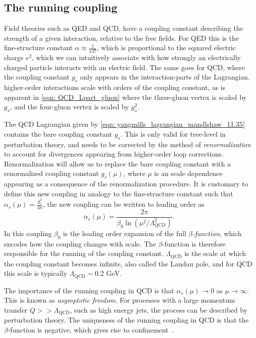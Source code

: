 \documentclass[main.tex]{subfiles}
\begin{document}
\subsection{The running coupling}
Field theories such as QED and QCD, have a coupling constant describing the strength of a given interaction, relative to the free fields. For QED this is the fine-structure constant \(\alpha \approx \frac{1}{137}\), which is proportional to the squared electric charge \(e^2\), which we can intuitively associate with how strongly an electrically charged particle interacts with an electric field. The same goes for QCD, where the coupling constant \(g_s\) only appears in the interaction-parts of the Lagrangian. higher-order interactions scale with orders of the coupling constant, as is apparent in \autoref{eqn: QCD_Lpart_gluon} where the three-gluon vertex is scaled by \(g_s\), and the four-gluon vertex is scaled by \(g_s^2\). 

The QCD Lagrangian given by \autoref{eqn: yangmills_lagrangian_mandlshaw_11.35} contains the bare coupling constant \(g_s\). This is only valid for tree-level in perturbation theory, and needs to be corrected by the method of \emph{renormalization} to account for divergences appearing from higher-order loop corrections. Renormalization will allow us to replace the bare coupling constant with a renormalized coupling constant \(g_r(\mu)\), where \(\mu\) is an scale dependence appearing as a consequence of the renormalization procedure. It is customary to define this new coupling in analogy to the fine-structure constant such that \(\alpha_s(\mu)=\frac{g_r^2}{4\pi}\), the new coupling can be written to leading order as
\begin{equation}\label{eqn: coupling_QCD_running}
    \alpha_s(\mu) = \frac{2\pi}{\beta_0 \ln(\mu^2/\Lambda_{\text{QCD}}^2)}.
\end{equation}
In this coupling \(\beta_0\) is the leading order expansion of the full \emph{\(\beta\)-function}, which encodes how the coupling changes with scale. The \(\beta\)-function is therefore responsible for the running of the coupling constant. \(\Lambda_{\text{QCD}}\) is the scale at which the coupling constant becomes infinite, also called the Landau pole, and for QCD this scale is typically \(\Lambda_{\text{QCD}} \sim 0.2 \text{ GeV}\).

The importance of the running coupling in QCD is that \(\alpha_s(\mu)\rightarrow 0\) as \(\mu\rightarrow \infty\). This is known as \textit{asymptotic freedom}. For processes with a large momentum transfer \(Q>>\Lambda_{\text{QCD}}\), such as high energy jets, the process can be described by perturbation theory. The uniqueness of the running coupling in QCD is that the \(\beta\)-function is negative, which gives rise to confinement~\cite{Caucal:2020zcz}.
\end{document}
